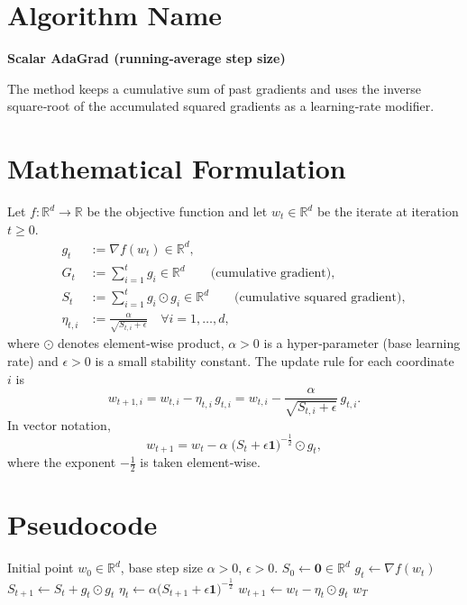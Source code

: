 \documentclass{article}
\newcommand{\R}{\mathbb{R}}
\begin{document}
\section*{Algorithm Name}
\textbf{Scalar AdaGrad (running‑average step size)}  

The method keeps a cumulative sum of past gradients and uses the inverse
square‑root of the accumulated squared gradients as a learning‑rate
modifier.

\section*{Mathematical Formulation}
Let $f:\R^d\rightarrow\R$ be the objective function and let $w_t\in\R^d$
be the iterate at iteration $t\ge 0$.  
\begin{align}
    g_t &:= \nabla f(w_t) \in \R^d, \\
    G_t &:= \sum_{i=1}^{t} g_i \in \R^d \qquad\text{(cumulative gradient)} ,\\
    S_t &:= \sum_{i=1}^{t} g_i\odot g_i \in \R^d \qquad\text{(cumulative squared gradient)} ,\\
    \eta_{t,i} &:= \frac{\alpha}{\sqrt{S_{t,i}+\epsilon}}\quad\forall i=1,\dots,d,
\end{align}
where $\odot$ denotes element‑wise product, $\alpha>0$ is a
hyper‑parameter (base learning rate) and $\epsilon>0$ is a small
stability constant.  
The update rule for each coordinate $i$ is
\begin{equation}
    w_{t+1,i}= w_{t,i}-\eta_{t,i}\,g_{t,i}
    = w_{t,i}-\frac{\alpha}{\sqrt{S_{t,i}+\epsilon}}\,g_{t,i}.
    \label{eq:update}
\end{equation}
In vector notation,
\[
    w_{t+1}= w_{t}-\alpha\;\bigl(S_{t}+\epsilon\mathbf 1\bigr)^{-\frac12}\odot g_{t},
\]
where the exponent $-\frac12$ is taken element‑wise.

\section*{Pseudocode}
\begin{algorithm}[H]
\caption{Scalar AdaGrad}
\begin{algorithmic}[1]
\Require Initial point $w_0\in\R^d$, base step size $\alpha>0$, $\epsilon>0$.
\State $S_0\gets \mathbf 0\in\R^d$ 
    \State $g_t\gets \nabla f(w_t)$
    \State $S_{t+1}\gets S_t+ g_t\odot g_t$
    \State $\eta_t\gets \alpha\bigl(S_{t+1}+\epsilon\mathbf 1\bigr)^{-\frac12}$ 
    \State $w_{t+1}\gets w_t-\eta_t\odot g_t$
\EndFor
\State \Return $w_T$
\end{algorithmic}
\end{algorithm}
\end{document}

